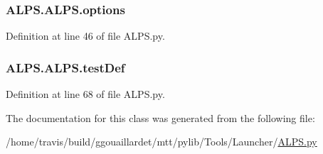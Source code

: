 \hypertarget{classALPS_1_1ALPS_a24dfa9b508f507c4cb6148f10a081555}{
\subsubsection[{options}]{\setlength{\rightskip}{0pt plus 5cm}A\-L\-P\-S.\-A\-L\-P\-S.\-options}}\label{classALPS_1_1ALPS_a24dfa9b508f507c4cb6148f10a081555}


Definition at line 46 of file A\-L\-P\-S.\-py.

\hypertarget{classALPS_1_1ALPS_a839c4f84a46683221d51004c08345ff2}{
\subsubsection[{test\-Def}]{\setlength{\rightskip}{0pt plus 5cm}A\-L\-P\-S.\-A\-L\-P\-S.\-test\-Def}}\label{classALPS_1_1ALPS_a839c4f84a46683221d51004c08345ff2}


Definition at line 68 of file A\-L\-P\-S.\-py.



The documentation for this class was generated from the following file\-:\begin{DoxyCompactItemize}
\item 
/home/travis/build/ggouaillardet/mtt/pylib/\-Tools/\-Launcher/\hyperlink{ALPS_8py}{A\-L\-P\-S.\-py}\end{DoxyCompactItemize}
